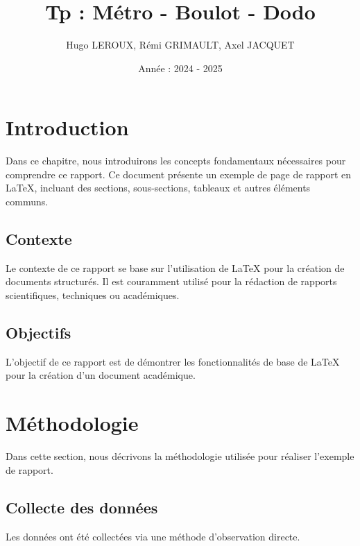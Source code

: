 \documentclass[a4paper,12pt]{report}
\title{Tp : Métro - Boulot - Dodo}
\author{Hugo LEROUX, Rémi GRIMAULT, Axel JACQUET}
\date{Année : 2024 - 2025}
\begin{document}
\maketitle

\tableofcontents %

\pagestyle{fancy}
\fancyhf{} %
\fancyfoot[R]{\thepage} %
\renewcommand{\headrulewidth}{0pt} %
\renewcommand{\footrulewidth}{0.4pt} %

\setcounter{page}{2}

\chapter{Introduction}
Dans ce chapitre, nous introduirons les concepts fondamentaux nécessaires pour comprendre ce rapport. Ce document présente un exemple de page de rapport en \LaTeX{}, incluant des sections, sous-sections, tableaux et autres éléments communs.

\section{Contexte}
Le contexte de ce rapport se base sur l'utilisation de \LaTeX{} pour la création de documents structurés. Il est couramment utilisé pour la rédaction de rapports scientifiques, techniques ou académiques.

\section{Objectifs}
L'objectif de ce rapport est de démontrer les fonctionnalités de base de \LaTeX{} pour la création d'un document académique.

\chapter{Méthodologie}
Dans cette section, nous décrivons la méthodologie utilisée pour réaliser l'exemple de rapport.

\section{Collecte des données}
Les données ont été collectées via une méthode d'observation directe.
\end{document}
